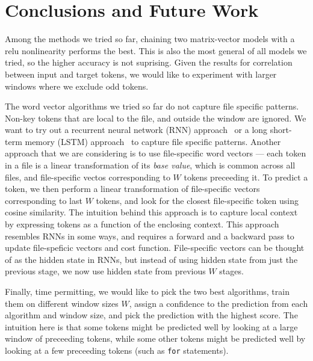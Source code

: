 \section{Conclusions and Future Work}
\label{sec:conclusions}

\noindent
Among the methods we tried so far, chaining two matrix-vector models with a
relu nonlinearity performs the best.
This is also the most general of all models we tried, so
the higher accuracy is not suprising. Given the results for correlation between
input and target tokens, we would like to experiment with larger windows
where we exclude odd tokens.

The word vector algorithms we tried so far do not capture file specific
patterns. Non-key tokens that are local to the file, and outside the window are
ignored. We want to try out a recurrent neural network (RNN)
approach~\cite{rnn} or a long short-term memory (LSTM) approach~\cite{lstm,
rnnlstm} to
capture file specific patterns. Another approach that we are considering is to
use file-specific word vectors --- each token in a file is a linear
transformation of its \emph{base value}, which is common across all files, and
file-specific vectos corresponding to $W$ tokens preceeding it.
To predict a token, we then perform a linear transformation of file-specific
vectors corresponding to last $W$ tokens, and look for the closest
file-specific token using cosine similarity. The intuition behind this approach
is to capture local context by expressing tokens as a function of the enclosing
context. This approach resembles RNNs in some ways, and requires a forward and
a backward pass to update file-speficic vectors and cost function.
File-specific vectors can be thought of as the hidden state in RNNs, but
instead of using hidden state from just the previous stage, we now use
hidden state from previous $W$ stages.

Finally, time permitting,
we would like to pick the two best algorithms, train them on different
window sizes $W$, assign a confidence to the prediction from each algorithm and
window size, and pick the prediction with the highest score.
The intuition here is that some tokens might be predicted well by
looking at a large window of preceeding tokens, while some other tokens might
be predicted well by looking at a few preceeding tokens (such as {\tt for}
statements).
